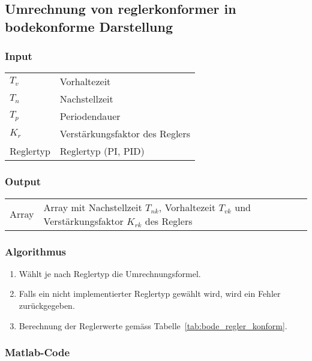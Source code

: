 \clearpage
\subsection{Umrechnung von reglerkonformer in bodekonforme Darstellung}

\subsubsection*{Input}
\begin{tabular}{p{40mm}l}
    $ T_v $        & Vorhaltezeit \\
    $ T_n $        & Nachstellzeit \\
    $ T_p $        & Periodendauer \\
    $ K_r $        & Verst\"arkungsfaktor des Reglers \\
    Reglertyp      & Reglertyp (PI, PID)
\end{tabular}

\subsubsection*{Output}
\begin{tabular}{p{40mm}l}
    Array & \parbox[t][4em][s]{0.7\textwidth}{Array mit Nachstellzeit $ T_{nk} $, Vorhaltezeit $ T_{vk} $ und Verst\"arkungsfaktor $ K_{rk} $ des Reglers}
\end{tabular}

\subsubsection*{Algorithmus}
\begin{enumerate}
    \item
        W\"ahlt je nach Reglertyp die Umrechnungsformel.
    \item
        Falls  ein nicht  implementierter Reglertyp  gew\"ahlt wird,  wird ein
        Fehler zur\"uckgegeben.
    \item
        Berechnung             der            Reglerwerte             gem\"ass
        Tabelle~\ref{tab:bode_regler_konform}.
\end{enumerate}
\subsubsection*{Matlab-Code}



